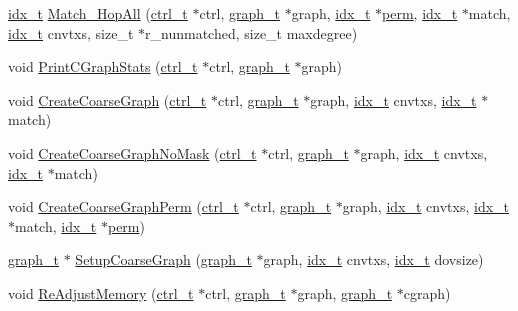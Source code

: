 \begin{DoxyCompactItemize}
\hyperlink{a00876_aaa5262be3e700770163401acb0150f52}{idx\+\_\+t} \hyperlink{a00182_aa56d53cace160be27fb1750dcaffbc04}{Match\+\_\+Hop\+All} (\hyperlink{a00742}{ctrl\+\_\+t} $\ast$ctrl, \hyperlink{a00734}{graph\+\_\+t} $\ast$graph, \hyperlink{a00876_aaa5262be3e700770163401acb0150f52}{idx\+\_\+t} $\ast$\hyperlink{a00879_ab96e9eb84fc7c342d17690a1341645dd}{perm}, \hyperlink{a00876_aaa5262be3e700770163401acb0150f52}{idx\+\_\+t} $\ast$match, \hyperlink{a00876_aaa5262be3e700770163401acb0150f52}{idx\+\_\+t} cnvtxs, size\+\_\+t $\ast$r\+\_\+nunmatched, size\+\_\+t maxdegree)
\item 
void \hyperlink{a00182_aac3e480e7e3bd02bfdf001d858a93562}{Print\+C\+Graph\+Stats} (\hyperlink{a00742}{ctrl\+\_\+t} $\ast$ctrl, \hyperlink{a00734}{graph\+\_\+t} $\ast$graph)
\item 
void \hyperlink{a00182_aac8820421b1c25698140c1b470c50e07}{Create\+Coarse\+Graph} (\hyperlink{a00742}{ctrl\+\_\+t} $\ast$ctrl, \hyperlink{a00734}{graph\+\_\+t} $\ast$graph, \hyperlink{a00876_aaa5262be3e700770163401acb0150f52}{idx\+\_\+t} cnvtxs, \hyperlink{a00876_aaa5262be3e700770163401acb0150f52}{idx\+\_\+t} $\ast$match)
\item 
void \hyperlink{a00182_a70dc59d4c7190507e7ad9a4cc0d80707}{Create\+Coarse\+Graph\+No\+Mask} (\hyperlink{a00742}{ctrl\+\_\+t} $\ast$ctrl, \hyperlink{a00734}{graph\+\_\+t} $\ast$graph, \hyperlink{a00876_aaa5262be3e700770163401acb0150f52}{idx\+\_\+t} cnvtxs, \hyperlink{a00876_aaa5262be3e700770163401acb0150f52}{idx\+\_\+t} $\ast$match)
\item 
void \hyperlink{a00182_a0aba484ba693edd6d56426d04bd7fd4b}{Create\+Coarse\+Graph\+Perm} (\hyperlink{a00742}{ctrl\+\_\+t} $\ast$ctrl, \hyperlink{a00734}{graph\+\_\+t} $\ast$graph, \hyperlink{a00876_aaa5262be3e700770163401acb0150f52}{idx\+\_\+t} cnvtxs, \hyperlink{a00876_aaa5262be3e700770163401acb0150f52}{idx\+\_\+t} $\ast$match, \hyperlink{a00876_aaa5262be3e700770163401acb0150f52}{idx\+\_\+t} $\ast$\hyperlink{a00879_ab96e9eb84fc7c342d17690a1341645dd}{perm})
\item 
\hyperlink{a00734}{graph\+\_\+t} $\ast$ \hyperlink{a00182_a113522304bf628b09d0b69b4db05050e}{Setup\+Coarse\+Graph} (\hyperlink{a00734}{graph\+\_\+t} $\ast$graph, \hyperlink{a00876_aaa5262be3e700770163401acb0150f52}{idx\+\_\+t} cnvtxs, \hyperlink{a00876_aaa5262be3e700770163401acb0150f52}{idx\+\_\+t} dovsize)
\item 
void \hyperlink{a00182_ab69ab96ec78174da232dff05e9c79d2f}{Re\+Adjust\+Memory} (\hyperlink{a00742}{ctrl\+\_\+t} $\ast$ctrl, \hyperlink{a00734}{graph\+\_\+t} $\ast$graph, \hyperlink{a00734}{graph\+\_\+t} $\ast$cgraph)
\end{DoxyCompactItemize}


